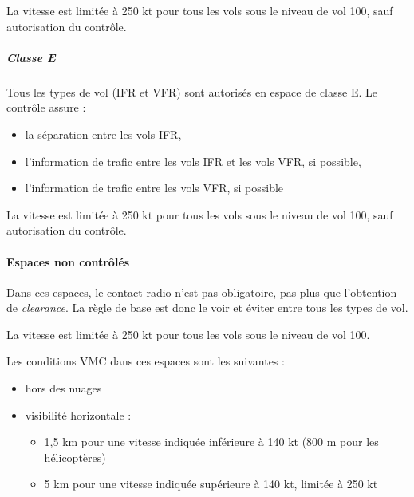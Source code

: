 		
		La vitesse est limitée à 250 kt pour tous les vols sous le niveau de vol 100, sauf autorisation du contrôle.
		
		\subparagraph{Classe E}
		Tous les types de vol (IFR et VFR) sont autorisés en espace de classe E. Le contrôle assure :
		\begin{itemize}
		\item la séparation entre les vols IFR,
		\item l'information de trafic entre les vols IFR et les vols VFR, si possible,
		\item l'information de trafic entre les vols VFR, si possible
		\end{itemize}
		
		
		
		La vitesse est limitée à 250 kt pour tous les vols sous le niveau de vol 100, sauf autorisation du contrôle.
		
		\paragraph{Espaces non contrôlés}
		Dans ces espaces, le contact radio n'est pas obligatoire, pas plus que l'obtention de \textit{clearance}. La règle de base est donc le voir et éviter entre tous les types de vol.
				
				
		La vitesse est limitée à 250 kt pour tous les vols sous le niveau de vol 100.
		
		Les conditions VMC dans ces espaces sont les suivantes :
		\begin{itemize}
			\item hors des nuages
			\item visibilité horizontale :
			\begin{itemize}
				\item 1,5 km pour une vitesse indiquée inférieure à 140 kt (800 m pour les hélicoptères)
				\item 5 km pour une vitesse indiquée supérieure à 140 kt, limitée à 250 kt
			\end{itemize}
		\end{itemize}
		
